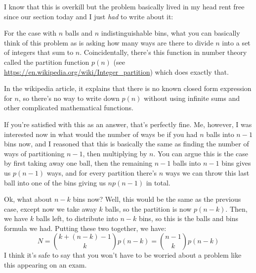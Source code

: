 \documentclass[10pt]{article}
\begin{document}
	I know that this is overkill but the problem basically lived in my head rent free since our section today 
	and I just 
	\textit{had} to write about it: 

	For the case with \( n \) balls and \( n \) indistinguishable bins, what you can basically think of this problem 
	as is asking how many ways are there to divide \( n \) into a set of integers that sum to \( n \). Coincidentally, 
	there's this function in number theory called the partition function \( p(n) \) (see 
	\url{https://en.wikipedia.org/wiki/Integer_partition}) which does exactly that.  

	In the wikipedia article, it explains that there is no known closed form expression for \( n \), so 
	there's no way to write down \( p(n) \) without using infinite sums and other complicated mathematical 
	functions. 


	If you're satisfied with this as an answer, that's perfectly fine. Me, however, I was interested now in 
	what would the number of ways be if you had \( n \) balls into \( n-1 \) bins now, 
	and I reasoned that this is basically the same as finding the number of ways of partitioning \( n-1 \), 
	then multiplying by \( n \). You can argue this is the case by first taking away one ball, then 
	the remaining \( n-1  \) 
	balls into \( n-1  \) bins gives us \( p(n-1) \) ways, and for every partition there's \( n \) ways we can 
	throw this last ball into one of the bins giving us \( np(n-1) \) in total. 
	 
	Ok, what about \( n-k \) bins now? Well, this would be the same as the previous case, except now we take 
	away \( k \) balls, so the partition is now \( p(n-k) \). Then, we have \( k \) balls left, to distribute into 
	\( n-k \) bins, so this is the balls and bins formula we had. Putting these two together, we have:
	\[
		N = {k + (n-k) - 1 \choose k}p(n-k) = {n -1 \choose k}p(n-k)
	\] 
	I think it's safe to say that you won't have to be worried about a problem like this appearing on an exam. 
\end{document}
